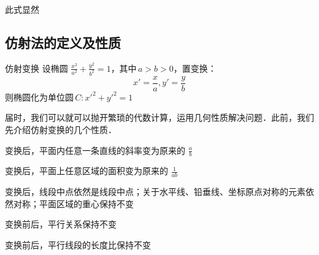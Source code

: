 此式显然
\subsection{仿射法的定义及性质}
\begin{definition}{仿射变换}
设椭圆 $\displaystyle{\frac{x^2}{a^2}+\frac{y^2}{b^2}=1}$，其中\,\(a>b>0\)，置变换：
$$x'=\frac{x}{a},y'=\frac{y}{b}$$
则椭圆化为单位圆\,\(C:x'^2+y'^2=1\)
\end{definition}
届时，我们可以就可以抛开繁琐的代数计算，运用几何性质解决问题．此前，我们先介绍仿射变换的几个性质．
\begin{lemma}{}
变换后，平面内任意一条直线的斜率变为原来的 $\displaystyle{\frac{a}{b}}$
\end{lemma}
\begin{lemma}{}
变换后，平面上任意区域的面积变为原来的 $\displaystyle{\frac1{ab}}$
\end{lemma}
\begin{lemma}{}
变换后，线段中点依然是线段中点；关于水平线、铅垂线、坐标原点对称的元素依然对称；平面区域的重心保持不变
\end{lemma}
\begin{lemma}{}
变换前后，平行关系保持不变
\end{lemma}
\begin{lemma}{}
变换前后，平行线段的长度比保持不变
\end{lemma}
